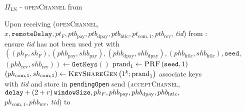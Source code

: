   \begin{figure}[H]
    \begin{protocolbox}{$\Pi_{\mathrm{LN}}$ - \textsc{openChannel} from \bob}
      \begin{algorithmic}[1]
        \State Upon receiving (\textsc{openChannel}, $x, \mathtt{remoteDelay},
        pt_F, ptb_{\mathrm{pay}}, ptb_{\mathrm{dpay}}, ptb_{\mathrm{htlc}},
        pt_{\mathrm{com}, 1}, ptb_{\mathrm{rev}}$, \textit{tid}) from \bob:
        \Indent
          \State ensure \textit{tid} has not been used yet with \bob
          \State $\left(\left(ph_F, sh_F\right), \left(phb_{\mathrm{pay}},
          shb_{\mathrm{pay}}\right), \left(phb_{\mathrm{dpay}},
          shb_{\mathrm{dpay}}\right), \left(phb_{\mathrm{htlc}},
          shb_{\mathrm{htlc}}\right), \mathtt{seed},\right.$
          $\left.\left(phb_{\mathrm{rev}}, shb_{\mathrm{rev}}\right)\right)
          \gets \texttt{GetKeys}\left(\right)$
          \State $\mathrm{prand}_1 \gets \textsc{PRF}\left(\mathtt{seed},
          1\right)$
          \label{alg:protocol:open:peer:prf}
          \State $\left(ph_{\mathrm{com}, 1}, sh_{\mathrm{com}, 1}\right) \gets
          \textsc{KeyShareGen}\left(1^k; \mathrm{prand}_1\right)$
          \State associate keys with \textit{tid} and store in
          \texttt{pendingOpen}
          \label{alg:protocol:open:openChannel:pendingOpen}
          \State send (\textsc{acceptChannel}, $\mathtt{delay}  + \left(2 + r\right)\texttt{windowSize},
          ph_F, phb_{\mathrm{pay}}, phb_{\mathrm{dpay}}, phb_{\mathrm{htlc}},$
          $ph_{\mathrm{com}, 1}, phb_{\mathrm{rev}}$, \textit{tid}) to \bob{}
        \EndIndent
      \end{algorithmic}
    \end{protocolbox}
    \caption{}
    \label{alg:protocol:open:openChannel}
  \end{figure}

